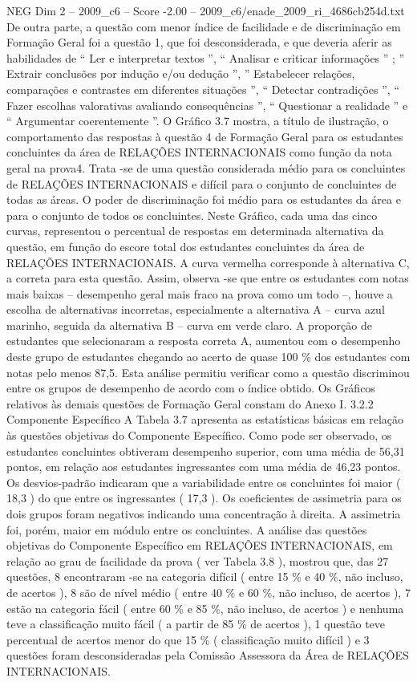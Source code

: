 \begin{textsample}{NEG Dim 2 – 2009\_c6 – Score -2.00 – 2009\_c6/enade\_2009\_ri\_4686cb254d.txt}
De outra parte, a questão com menor índice de facilidade e de discriminação em Formação Geral foi a questão 1, que foi desconsiderada, e que deveria aferir as habilidades de “ Ler e interpretar textos ”, “ Analisar e criticar informações ” ; ” Extrair conclusões por indução e/ou dedução ”, ” Estabelecer relações, comparações e contrastes em diferentes situações ”, “ Detectar contradições ”, “ Fazer escolhas valorativas avaliando consequências ”, “ Questionar a realidade ” e “ Argumentar coerentemente ”.
O Gráfico 3.7 mostra, a título de ilustração, o comportamento das respostas à questão 4 de Formação Geral para os estudantes concluintes da área de RELAÇÕES INTERNACIONAIS como função da nota geral na prova4.
Trata -se de uma questão considerada médio para os concluintes de RELAÇÕES INTERNACIONAIS e difícil para o conjunto de concluintes de todas as áreas.
O poder de discriminação foi médio para os estudantes da área e para o conjunto de todos os concluintes.
Neste Gráfico, cada uma das cinco curvas, representou o percentual de respostas em determinada alternativa da questão, em função do escore total dos estudantes concluintes da área de RELAÇÕES INTERNACIONAIS.
A curva vermelha corresponde à alternativa C, a correta para esta questão.
Assim, observa -se que entre os estudantes com notas mais baixas – desempenho geral mais fraco na prova como um todo –, houve a escolha de alternativas incorretas, especialmente a alternativa A – curva azul marinho, seguida da alternativa B – curva em verde claro.
A proporção de estudantes que selecionaram a resposta correta A, aumentou com o desempenho deste grupo de estudantes chegando ao acerto de quase 100 \% dos estudantes com notas pelo menos 87,5.
Esta análise permitiu verificar como a questão discriminou entre os grupos de desempenho de acordo com o índice obtido.
Os Gráficos relativos às demais questões de Formação Geral constam do Anexo I. 3.2.2 Componente Específico A Tabela 3.7 apresenta as estatísticas básicas em relação às questões objetivas do Componente Específico.
Como pode ser observado, os estudantes concluintes obtiveram desempenho superior, com uma média de 56,31 pontos, em relação aos estudantes ingressantes com uma média de 46,23 pontos.
Os desvios-padrão indicaram que a variabilidade entre os concluintes foi maior ( 18,3 ) do que entre os ingressantes ( 17,3 ).
Os coeficientes de assimetria para os dois grupos foram negativos indicando uma concentração à direita.
A assimetria foi, porém, maior em módulo entre os concluintes.
A análise das questões objetivas do Componente Específico em RELAÇÕES INTERNACIONAIS, em relação ao grau de facilidade da prova ( ver Tabela 3.8 ), mostrou que, das 27 questões, 8 encontraram -se na categoria difícil ( entre 15 \% e 40 \%, não incluso, de acertos ), 8 são de nível médio ( entre 40 \% e 60 \%, não incluso, de acertos ), 7 estão na categoria fácil ( entre 60 \% e 85 \%, não incluso, de acertos ) e nenhuma teve a classificação muito fácil ( a partir de 85 \% de acertos ), 1 questão teve percentual de acertos menor do que 15 \% ( classificação muito difícil ) e 3 questões foram desconsideradas pela Comissão Assessora da Área de RELAÇÕES INTERNACIONAIS.

\end{textsample}
